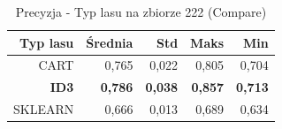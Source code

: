 \begin{table}[htbp]
\centering
\small
\setlength{\tabcolsep}{6pt}
\renewcommand{\arraystretch}{1.2}
\caption{Precyzja - Typ lasu na zbiorze 222 (Compare)}
\label{tab:Compare_on_222_precision}
\begin{tabular}{r|r|r|r|r}
\toprule
Typ lasu & Średnia & Std & Maks & Min \\
\hline
CART & 0,765 & 0,022 & 0,805 & 0,704 \\
\textbf{ID3} & \textbf{0,786} & \textbf{0,038} & \textbf{0,857} & \textbf{0,713} \\
SKLEARN & 0,666 & 0,013 & 0,689 & 0,634 \\
\bottomrule
\end{tabular}
\end{table}